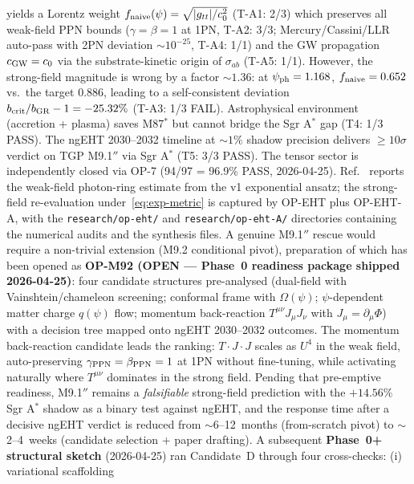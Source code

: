 \documentclass[11pt,a4paper]{article}
\renewcommand{\Phi}{\varPhi}
\begin{document}
\begin{itemize}[nosep]
    yields a Lorentz weight $f_{\rm naive}(\psi)=\sqrt{|g_{tt}|/c_{0}^{2}}$
    (T-A1: 2/3) which preserves all weak-field PPN bounds
    ($\gamma=\beta=1$ at 1PN, T-A2: 3/3; Mercury/Cassini/LLR auto-pass
    with 2PN deviation $\sim 10^{-25}$, T-A4: 1/1) and the GW propagation
    $c_{\rm GW}=c_{0}$ via the substrate-kinetic origin of $\sigma_{ab}$
    (T-A5: 1/1). However, the strong-field magnitude is wrong by a factor
    $\sim 1.36$: at $\psi_{\rm ph}=1.168$, $f_{\rm naive}=0.652$ vs.\ the
    target $0.886$, leading to a self-consistent deviation
    $b_{\rm crit}/b_{\rm GR}-1=-25.32\%$ (T-A3: 1/3 FAIL).
    Astrophysical environment (accretion + plasma) saves M87$^*$ but
    cannot bridge the Sgr A$^*$ gap (T4: 1/3 PASS). The ngEHT 2030--2032
    timeline at $\sim 1\%$ shadow precision delivers $\geq 10\sigma$
    verdict on TGP M9.1$''$ via Sgr A$^*$ (T5: 3/3 PASS). The tensor
    sector is independently closed via OP-7 (94/97 = 96.9\% PASS,
    2026-04-25). Ref.~\cite{TGP-BH} reports the weak-field photon-ring
    estimate from the v1 exponential ansatz; the strong-field re-evaluation
    under~\eqref{eq:exp-metric} is captured by OP-EHT plus OP-EHT-A,
    with the \texttt{research/op-eht/} and \texttt{research/op-eht-A/}
    directories containing the numerical audits and the synthesis files.
    A genuine M9.1$''$ rescue would require a non-trivial extension
    (M9.2 conditional pivot), preparation of which has been opened as
    \textbf{OP-M92 (OPEN — Phase~0 readiness package shipped 2026-04-25)}:
    four candidate structures pre-analysed (dual-field with
    Vainshtein/chameleon screening; conformal frame with $\Omega(\psi)$;
    $\psi$-dependent matter charge $q(\psi)$ flow; momentum back-reaction
    $T^{\mu\nu}J_{\mu}J_{\nu}$ with $J_{\mu}=\partial_{\mu}\Phi$) with a
    decision tree mapped onto ngEHT 2030--2032 outcomes. The momentum
    back-reaction candidate leads the ranking: $T \cdot J \cdot J$ scales
    as $U^{4}$ in the weak field, auto-preserving $\gamma_{\rm PPN}=
    \beta_{\rm PPN}=1$ at 1PN without fine-tuning, while activating
    naturally where $T^{\mu\nu}$ dominates in the strong field. Pending
    that pre-emptive readiness, M9.1$''$ remains a \emph{falsifiable}
    strong-field prediction with the $+14.56\%$ Sgr A$^*$ shadow as a
    binary test against ngEHT, and the response time after a decisive
    ngEHT verdict is reduced from $\sim$6--12~months (from-scratch
    pivot) to $\sim$2--4~weeks (candidate selection + paper drafting).
    A subsequent \textbf{Phase~0+ structural sketch} (2026-04-25) ran
    Candidate~D through four cross-checks: (i) variational scaffolding

\end{itemize}
\end{document}
